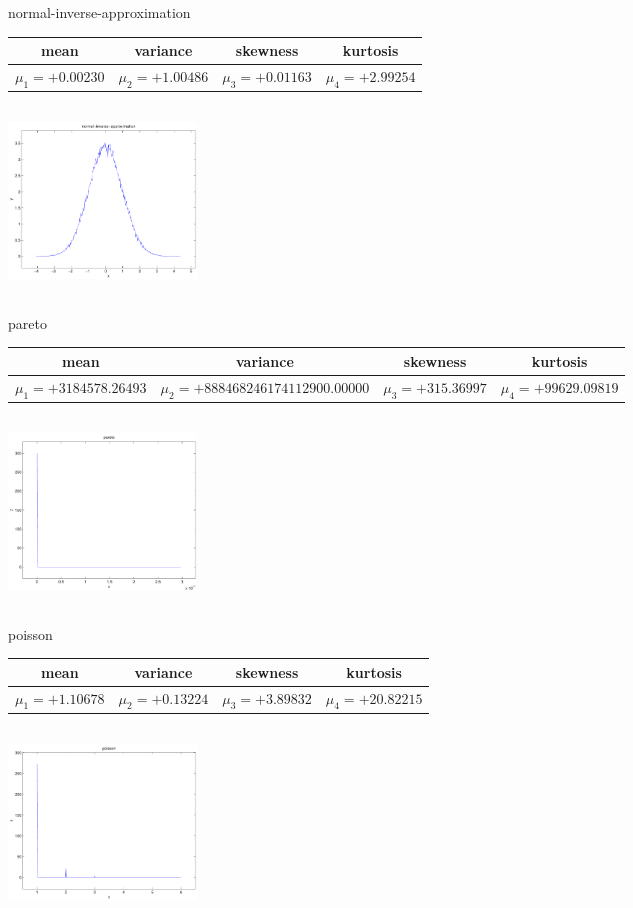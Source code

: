 \documentclass[9pt]{article}
\theoremstyle{plain}
\theoremstyle{definition}
\theoremstyle{remark}
\numberwithin{equation}{section}
\begin{document}
\newpage
normal-inverse-approximation \begin{tabular}{|c|c|c|c|}  mean & variance & skewness & kurtosis \\  \hline
$\mu_1 = +0.00230$ & $\mu_2 = +1.00486$ & $\mu_3 = +0.01163$ & $\mu_4 =+2.99254$ \\
\end{tabular}

\includegraphics[width=5cm,height=5cm]{normal-inverse-approximation.pdf}

pareto \begin{tabular}{|c|c|c|c|}  mean & variance & skewness & kurtosis \\  \hline
$\mu_1 = +3184578.26493$ & $\mu_2 = +888468246174112900.00000$ & $\mu_3 = +315.36997$ & $\mu_4 =+99629.09819$ \\
\end{tabular}

\includegraphics[width=5cm,height=5cm]{pareto.pdf}

poisson \begin{tabular}{|c|c|c|c|}  mean & variance & skewness & kurtosis \\  \hline
$\mu_1 = +1.10678$ & $\mu_2 = +0.13224$ & $\mu_3 = +3.89832$ & $\mu_4 =+20.82215$ \\
\end{tabular}

\includegraphics[width=5cm,height=5cm]{poisson.pdf}
\end{document}
